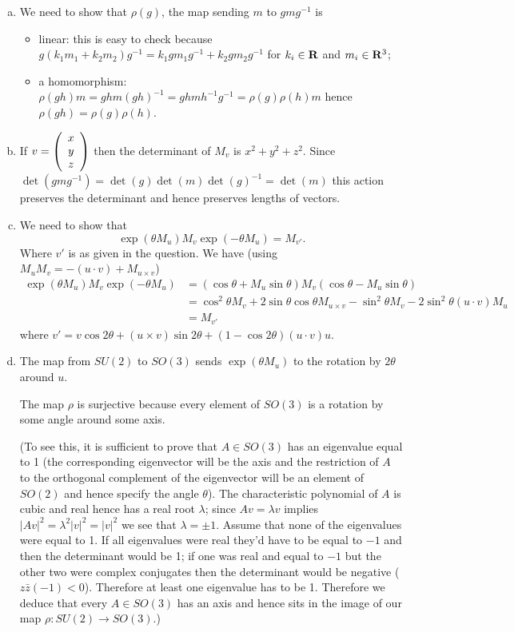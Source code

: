 \documentclass[12pt]{article}
\begin{document}
\begin{answer}
\begin{enumerate}[(a)]
\item We need to show that $\rho(g)$, the map sending $m$ to $gmg^{-1}$ is
\begin{itemize}
\item linear: this is easy to check because $g(k_1m_1+k_2m_2)g^{-1}=k_1gm_1g^{-1}+k_2gm_2g^{-1}$ for $k_i\in\mathbf{R}$ and $m_i\in\mathbf{R}^3$;
\item a homomorphism: $\rho(gh)m=ghm(gh)^{-1}=ghmh^{-1}g^{-1}=\rho(g)\rho(h)m$ hence $\rho(gh)=\rho(g)\rho(h)$.
\end{itemize}
\item If $v=\left(\begin{array}{c}x \\ y \\ z\end{array}\right)$ then the determinant of $M_v$ is $x^2+y^2+z^2$. Since $\det(gmg^{-1})=\det(g)\det(m)\det(g)^{-1}=\det(m)$ this action preserves the determinant and hence preserves lengths of vectors.
\item We need to show that
\[\exp(\theta M_u)M_v\exp(-\theta M_u)=M_{v'}.\]
Where $v'$ is as given in the question. We have (using $M_uM_v=-(u\cdot v)+M_{u\times v}$)
\begin{align*}
\exp(\theta M_u)M_v\exp(-\theta M_u)&=(\cos\theta+M_u\sin\theta)M_v(\cos\theta-M_u\sin\theta)\\
                                   &=\cos^2\theta M_v+2\sin\theta\cos\theta M_{u\times v}-\sin^2\theta M_v-2\sin^2\theta(u\cdot v)M_u\\
                                   &=M_{v'}
\end{align*}
where $v'=v\cos 2\theta+(u\times v)\sin 2\theta +(1-\cos 2\theta)(u\cdot v)u$.
\item The map from $SU(2)$ to $SO(3)$ sends $\exp(\theta M_u)$ to the rotation by $2\theta$ around $u$.

The map $\rho$ is surjective because every element of $SO(3)$ is a rotation by some angle around some axis.

(To see this, it is sufficient to prove that $A\in SO(3)$ has an eigenvalue equal to 1 (the corresponding eigenvector will be the axis and the restriction of $A$ to the orthogonal complement of the eigenvector will be an element of $SO(2)$ and hence specify the angle $\theta$). The characteristic polynomial of $A$ is cubic and real hence has a real root $\lambda$; since $Av=\lambda v$ implies $|Av|^2=\lambda^2|v|^2=|v|^2$ we see that $\lambda=\pm 1$. Assume that none of the eigenvalues were equal to 1. If all eigenvalues were real they'd have to be equal to $-1$ and then the determinant would be 1; if one was real and equal to $-1$ but the other two were complex conjugates then the determinant would be negative ($z\bar{z}(-1)<0$). Therefore at least one eigenvalue has to be 1. Therefore we deduce that every $A\in SO(3)$ has an axis and hence sits in the image of our map $\rho\colon SU(2)\to SO(3)$.)


\end{enumerate}
\end{answer}
\end{document}
